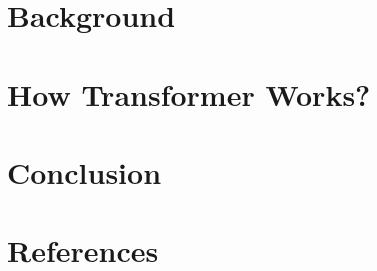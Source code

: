 \section[Back]{Background}


\section[How]{How Transformer Works?}


\section[Cncl]{Conclusion}


\section[Refs]{References}

